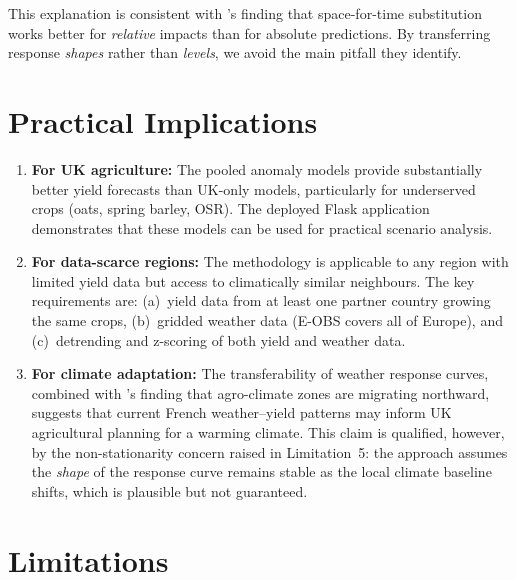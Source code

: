 \documentclass[12pt,a4paper]{report}
\begin{document}
This explanation is consistent with \citet{evans2025}'s finding that space-for-time substitution works better for \emph{relative} impacts than for absolute predictions. By transferring response \emph{shapes} rather than \emph{levels}, we avoid the main pitfall they identify.

\section{Practical Implications}

\begin{enumerate}
    \item \textbf{For UK agriculture:} The pooled anomaly models provide substantially better yield forecasts than UK-only models, particularly for underserved crops (oats, spring barley, OSR). The deployed Flask application demonstrates that these models can be used for practical scenario analysis.

    \item \textbf{For data-scarce regions:} The methodology is applicable to any region with limited yield data but access to climatically similar neighbours. The key requirements are: (a)~yield data from at least one partner country growing the same crops, (b)~gridded weather data (E-OBS covers all of Europe), and (c)~detrending and z-scoring of both yield and weather data.

    \item \textbf{For climate adaptation:} The transferability of weather response curves, combined with \citet{ceglar2019}'s finding that agro-climate zones are migrating northward, suggests that current French weather--yield patterns may inform UK agricultural planning for a warming climate. This claim is qualified, however, by the non-stationarity concern raised in Limitation~5: the approach assumes the \emph{shape} of the response curve remains stable as the local climate baseline shifts, which is plausible but not guaranteed.
\end{enumerate}

\section{Limitations}
\end{document}
